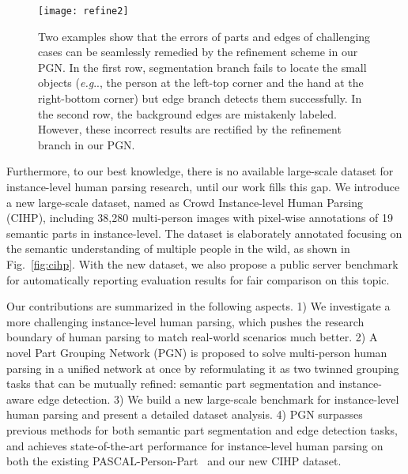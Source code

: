 \documentclass[runningheads]{llncs}
\makeatletter
\DeclareRobustCommand\onedot{\futurelet\@let@token\@onedot}
\def\@onedot{\ifx\@let@token.\else.\null\fi\xspace}
\def\eg{\emph{e.g}\onedot} \def\Eg{\emph{E.g}\onedot}
\makeatother
\begin{document}
\begin{figure}[t]
\begin{center}
   \texttt{[image: refine2]}
\end{center}
\vspace{-6mm}
\caption{Two examples show that the errors of parts and edges of challenging cases can be seamlessly remedied by the refinement scheme in our PGN. In the first row, segmentation branch fails to locate the small objects (\eg, the person at the left-top corner and the hand at the right-bottom corner) but edge branch detects them successfully. In the second row, the background edges are mistakenly labeled. However, these incorrect results are rectified by the refinement branch in our PGN.}
\vspace{-6mm}
\label{fig:refined}
\end{figure}


Furthermore, to our best knowledge, there is no available large-scale dataset for instance-level human parsing research, until our work fills this gap. We introduce a new large-scale dataset, named as Crowd Instance-level Human Parsing (CIHP), including 38,280 multi-person images with pixel-wise annotations of 19 semantic parts in instance-level. The dataset is elaborately annotated focusing on the semantic understanding of multiple people in the wild, as shown in Fig.~\ref{fig:cihp}. With the new dataset, we also propose a public server benchmark for automatically reporting evaluation results for fair comparison on this topic.

Our contributions are summarized in the following aspects. 1) We investigate a more challenging instance-level human parsing, which pushes the research boundary of human parsing to match real-world scenarios much better. 2) A novel Part Grouping Network (PGN) is proposed to solve multi-person human parsing in a unified network at once by reformulating it as two twinned grouping tasks that can be mutually refined: semantic part segmentation and instance-aware edge detection. 3) We build a new large-scale benchmark for instance-level human parsing and present a detailed dataset analysis. 4) PGN surpasses previous methods for both semantic part segmentation and edge detection tasks, and achieves state-of-the-art performance for instance-level human parsing on both the existing PASCAL-Person-Part~\cite{chen2014detect} and our new CIHP dataset.



\end{document}
